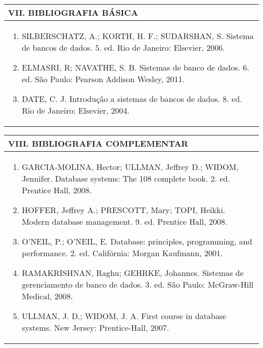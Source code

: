 \documentclass[12pt]{article}
\begin{document}
\begin{longtable}{|L{1.025\textwidth}|} \hline
%
{\bf VII. BIBLIOGRAFIA BÁSICA} \\ \hline
\begin{enumerate}
%
\item SILBERSCHATZ, A.; KORTH, H. F.; SUDARSHAN, S. Sistema de bancos de dados. 5. ed. Rio de Janeiro: Elsevier, 2006. 
\item ELMASRI, R; NAVATHE, S. B. Sistemas de banco de dados. 6. ed. São Paulo: Pearson Addison Wesley, 2011. 
\item DATE, C. J. Introdução a sistemas de bancos de dados. 8. ed. Rio de Janeiro: Elsevier, 2004.
\end{enumerate}
 \\ \hline
\end{longtable}


\newpage

\begin{longtable}{|L{1.025\textwidth}|} \hline
%
{\bf VIII. BIBLIOGRAFIA COMPLEMENTAR} \\ \hline
\begin{enumerate}
\item GARCIA-MOLINA, Hector; ULLMAN, Jeffrey D.; WIDOM, Jennifer. Database systems: The 108 complete book. 2. ed. Prentice Hall, 2008. 
\item HOFFER, Jeffrey A.; PRESCOTT, Mary; TOPI, Heikki. Modern database management. 9. ed. Prentice Hall, 2008. 
\item O'NEIL, P.; O'NEIL, E. Database: principles, programming, and performance. 2. ed. Califórnia: Morgan Kaufmann, 2001. 
\item RAMAKRISHNAN, Raghu; GEHRKE, Johannes. Sistemas de gerenciamento de banco de dados. 3. ed. São Paulo: McGraw-Hill Medical, 2008. 
\item ULLMAN, J. D.; WIDOM, J. A. First course in database systems. New Jersey: Prentice-Hall, 2007.

%
\end{enumerate}
 \\ \hline
\end{longtable}



\end{document}
